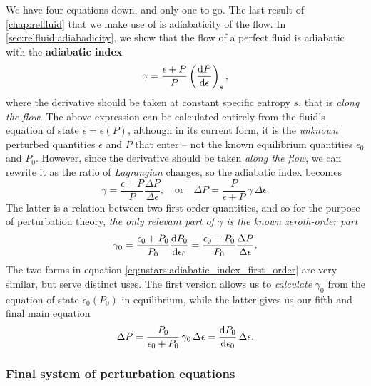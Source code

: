 We have four equations down, and only one to go.
The last result of \cref{chap:relfluid} that we make use of is adiabaticity of the flow.
In \cref{sec:relfluid:adiabadicity}, we show that the flow of a perfect fluid is adiabatic with the \textbf{adiabatic index}
\begin{equation}
	\gamma = \frac{\epsilon+P}{P} \left( \odv{P}{\epsilon} \right)_s,
\label{eq:nstars:adiabatic_index0}
\end{equation}
where the derivative should be taken at constant specific entropy $s$, that is \emph{along the flow}.
The above expression can be calculated entirely from the fluid's equation of state $\epsilon = \epsilon(P)$, although in its current form, it is the \emph{unknown} perturbed quantities $\epsilon$ and $P$ that enter -- not the known equilibrium quantities $\epsilon_0$ and $P_0$.
However, since the derivative should be taken \emph{along the flow}, we can rewrite it as the ratio of \emph{Lagrangian} changes, so the adiabatic index becomes
\begin{equation}
	\gamma = 
	\frac{\epsilon+P}{P} \frac{\Delta P}{\Delta \epsilon} ,
	\quad \text{or} \quad
	\Delta P = \frac{P}{\epsilon + P} \, \gamma \, \Delta \epsilon .
\label{eq:nstars:adiabatic_index}
\end{equation}
The latter is a relation between two first-order quantities, and so for the purpose of perturbation theory, \emph{the only relevant part of $\gamma$ is the known zeroth-order part}
\begin{equation}
	\gamma_0 = \frac{\epsilon_0+P_0}{P_0} \odv{P_0}{\epsilon_0}
	         = \frac{\epsilon_0+P_0}{P_0} \frac{\Delta P}{\Delta \epsilon} .
\label{eq:nstars:adiabatic_index_first_order}
\end{equation}
The two forms in equation \eqref{eq:nstars:adiabatic_index_first_order} are very similar, but serve distinct uses.
The first version allows us to \emph{calculate} $\gamma_0$ from the equation of state $\epsilon_0(P_0)$ in equilibrium, while the latter gives us our fifth and final main equation
\begin{equation}
	\Delta P = \frac{P_0}{\epsilon_0 + P_0} \, \gamma_0 \, \Delta \epsilon
	         = \odv{P_0}{\epsilon_0} \, \Delta\epsilon .
\label{eq:nstars:Delta_P}
\end{equation}

\subsubsection{Final system of perturbation equations}

